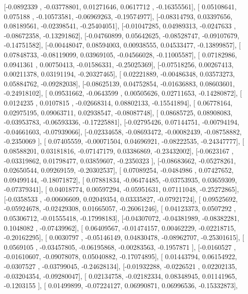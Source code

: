\documentclass{article}
\begin{document}
       [-0.0892339 , -0.03778801,  0.01271646,  0.0617712 , -0.16355561],
       [ 0.05108641,  0.075188  , -0.10573581, -0.06969263, -0.19574977],
       [-0.08314793,  0.03397656,  0.08189561, -0.02398541, -0.25404051],
       [-0.01047285,  0.04989313, -0.0247633 , -0.08672358, -0.13291862],
       [-0.04760899,  0.05642625, -0.08528747, -0.09107679, -0.14751582],
       [-0.00448047,  0.08594003,  0.00938555,  0.04533477, -0.13899857],
       [ 0.07848733, -0.08119099,  0.03969105, -0.04566028, -0.11005587],
       [ 0.07182986,  0.0941361 ,  0.00750413, -0.01586331, -0.25025369],
       [-0.07518256,  0.00267413,  0.00211378,  0.03191194, -0.20327465],
       [ 0.02221889, -0.00486348,  0.03573273,  0.05884762, -0.09282038],
       [-0.08625139,  0.04752854, -0.01636883,  0.08603601, -0.24918102],
       [ 0.09531662, -0.0643599 ,  0.00505626,  0.02711653, -0.14280872],
       [ 0.0124235 ,  0.0107815 , -0.02668314,  0.08802133, -0.15541894],
       [ 0.06778164,  0.02975195,  0.09063711,  0.02938547, -0.08087748],
       [ 0.08685725,  0.08908083, -0.03953783, -0.06593336, -0.17225881],
       [-0.02795426,  0.07144751, -0.00794194, -0.04661603, -0.07939066],
       [-0.02334658, -0.08693472, -0.00082439, -0.08758882, -0.2350069 ],
       [ 0.07405559, -0.00071504,  0.04696921, -0.08222535, -0.24347777],
       [ 0.08588201,  0.03181816, -0.07147179,  0.03386869, -0.23432002],
       [-0.0623167 , -0.03319862,  0.01798477,  0.03859607, -0.2350323 ],
       [-0.08683662, -0.05278261,  0.02650544,  0.09269159, -0.20302537],
       [ 0.07089254, -0.0484986 ,  0.07427652,  0.09499144, -0.18071872],
       [ 0.07881834, -0.06474485, -0.03753935,  0.03659309, -0.07379341],
       [ 0.04018774,  0.00597294, -0.05951631,  0.07111048, -0.25272865],
       [-0.0358533 , -0.00606609,  0.02049354,  0.03335827, -0.07921724],
       [ 0.09525692, -0.05924678, -0.02429308,  0.01665057, -0.26061246],
       [ 0.04123373,  0.0507292 ,  0.05306712, -0.01555418, -0.17998183],
       [-0.04307072, -0.04381989, -0.08382281,  0.1048082 , -0.07439962],
       [ 0.06409567, -0.01474157,  0.00462229, -0.02218715, -0.20162295],
       [ 0.0030797 , -0.05146149,  0.04830478, -0.08962707, -0.25301615],
       [ 0.0569105 , -0.03457805, -0.06195868, -0.00283563, -0.1957871 ],
       [-0.0160527 , -0.01610607, -0.09078078,  0.05040882, -0.17074895],
       [ 0.01443794,  0.06154922, -0.0307527 , -0.03799045, -0.24628134],
       [-0.01932288, -0.0226521 ,  0.02202135, -0.03204354, -0.09280047],
       [ 0.02134758, -0.02182334,  0.08348945,  0.01141965, -0.1203155 ],
       [ 0.01499899, -0.07224127,  0.06990871,  0.06996536, -0.15332873],
\end{document}
